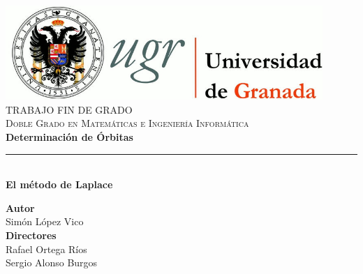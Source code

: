 \begin{titlepage}
 
 
\newlength{\centeroffset}
\setlength{\centeroffset}{-0.5\oddsidemargin}
\addtolength{\centeroffset}{0.5\evensidemargin}
\thispagestyle{empty}

\noindent\hspace*{\centeroffset}

\begin{minipage}{\textwidth}
	\centering
	\includegraphics[width=0.9\textwidth]{images/logo_ugr.jpg}\\[1.2cm]
	
	\textsc{\Large TRABAJO FIN DE GRADO\\[0.2cm]}
	\textsc{Doble Grado en Matemáticas e Ingeniería Informática}\\[0.8cm]
	{\Huge\bfseries Determinación de Órbitas\\
	}
	\noindent\rule[-1ex]{\textwidth}{1pt}\\[2.5ex]
	{\large\bfseries El método de Laplace}
\end{minipage}

\vspace{1cm}

\noindent\hspace*{\centeroffset}

\begin{minipage}{\textwidth}
	\centering
	\textbf{Autor}\\ {Simón López Vico}\\[2.5ex]
	\textbf{Directores}\\ {Rafael Ortega Ríos\\Sergio Alonso Burgos}\\[1.5cm]
	

\end{minipage}
\end{titlepage}
